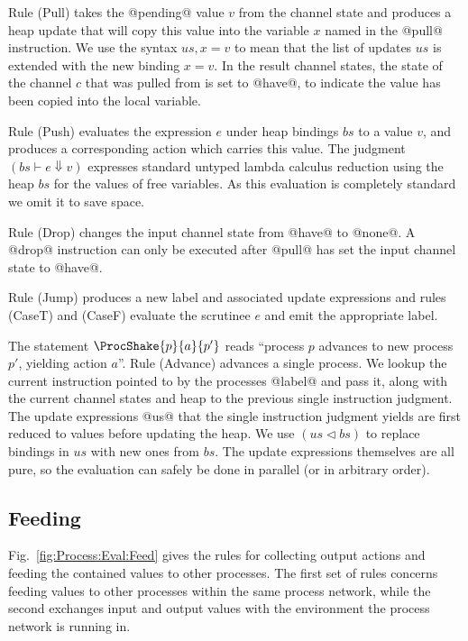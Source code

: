 Rule (Pull) takes the @pending@ value $v$ from the channel state and produces a heap update that will copy this value into the variable $x$ named in the @pull@ instruction. We use the syntax $us,x=v$ to mean that the list of updates $us$ is extended with the new binding $x=v$. In the result channel states, the state of the channel $c$ that was pulled from is set to @have@, to indicate the value has been copied into the local variable.

Rule (Push) evaluates the expression $e$ under heap bindings $bs$ to a value $v$, and produces a corresponding action which carries this value. The judgment $(bs \vdash e \Downarrow v)$ expresses standard untyped lambda calculus reduction using the heap $bs$ for the values of free variables. As this evaluation is completely standard we omit it to save space.

Rule (Drop) changes the input channel state from @have@ to @none@. A @drop@ instruction can only be executed after @pull@ has set the input channel state to @have@. 

Rule (Jump) produces a new label and associated update expressions and rules (CaseT) and (CaseF) evaluate the scrutinee $e$ and emit the appropriate label.

The statement $\ProcShake{p}{a}{p'}$ reads ``process $p$ advances to new process $p'$, yielding action $a$''. Rule (Advance) advances a single process. We lookup the current instruction pointed to by the processes @label@ and pass it, along with the current channel states and heap to the previous single instruction judgment. The update expressions @us@ that the single instruction judgment yields are first reduced to values before updating the heap. We use $(us \lhd bs)$ to replace bindings in $us$ with new ones from $bs$. The update expressions themselves are all pure, so the evaluation can safely be done in parallel (or in arbitrary order).


\subsection{Feeding}
Fig.~\ref{fig:Process:Eval:Feed} gives the rules for collecting output actions and feeding the contained values to other processes. The first set of rules concerns feeding values to other processes within the same process network, while the second exchanges input and output values with the environment the process network is running in.

